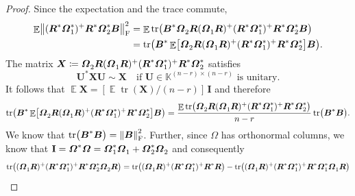 \documentclass[11pt]{article}
\newcommand{\field}{\mathbb{K}}
\DeclareMathOperator{\tr}{tr}
\newcommand{\mat}[1]{\boldsymbol{#1}}
\newcommand{\norm}[1]{\mleft\| #1 \mright\|}
\newcommand{\Id}{\mathbf{I}}
\DeclareMathOperator{\expect}{\mathbb{E}}
\theoremstyle{definition}
\numberwithin{equation}{section}
\begin{document}
\begin{proof}
Since the expectation and the trace commute,
\begin{align*}
    \expect \norm{(\mat{R}^* \mat{\varOmega}_1^*)^+ \mat{R}^* \mat{\varOmega}_2^* \mat{B}}_{\rm F}^2
    &= \expect \tr\bigl(\mat{B}^* \mat{\varOmega}_2^{\vphantom{*}} \mat{R} (\mat{\varOmega}_1^{\vphantom{*}} \mat{R})^{+} (\mat{R}^* \mat{\varOmega}_1^*)^{+} \mat{R}^* \mat{\varOmega}_2^* \mat{B}\bigr) \\
    &= \tr\bigl(\mat{B}^* \expect\bigl[ \mat{\varOmega}_2^{\vphantom{*}} \mat{R} (\mat{\varOmega}_1^{\vphantom{*}} \mat{R})^{+} (\mat{R}^* \mat{\varOmega}_1^*)^{+} \mat{R}^* \mat{\varOmega}_2^* \bigr] \mat{B}\bigr).
\end{align*}
The matrix $\mat{X} \coloneqq \mat{\varOmega}_2^{\vphantom{*}} \mat{R} (\mat{\varOmega}_1^{\vphantom{*}} \mat{R})^{+} (\mat{R}^* \mat{\varOmega}_1^*)^{+} \mat{R}^* \mat{\varOmega}_2^*$ satisfies
\begin{equation*}
\mat{U}^*\mat{X}\mat{U} \sim \mat{X} \quad \text{if } \mat{U} \in \field^{(n-r) \times (n-r)} \text{ is unitary}.
\end{equation*}
It follows that $\expect \mat{X} = [\expect \tr (\mat{X}) / (n-r) ] \,\Id$ and therefore
\begin{equation*}
    \tr\bigl(\mat{B}^* \expect\bigl[ \mat{\varOmega}_2^{\vphantom{*}} \mat{R} (\mat{\varOmega}_1^{\vphantom{*}} \mat{R})^{+} (\mat{R}^* \mat{\varOmega}_1^*)^{+} \mat{R}^* \mat{\varOmega}_2^* \bigr] \mat{B}\bigr)
    = \frac{ \expect \tr\bigl( \mat{\varOmega}_2^{\vphantom{*}} \mat{R} (\mat{\varOmega}_1^{\vphantom{*}} \mat{R})^{+} (\mat{R}^* \mat{\varOmega}_1^*)^{+} \mat{R}^* \mat{\varOmega}_2^* \bigr)}{n-r}
    \tr\bigl(\mat{B}^* \mat{B} \bigr).
\end{equation*}
We know that $\tr\bigl(\mat{B}^* \mat{B} \bigr) = \norm{\mat{B}}_{\rm F}^2$.
Further, since $\mat{\varOmega}$ has orthonormal columns, we know that $\Id = \mat{\varOmega}^* \mat{\varOmega} = \mat{\varOmega}_1^* \mat{\varOmega}_1^{\vphantom{*}} + \mat{\varOmega}_2^* \mat{\varOmega}_2^{\vphantom{*}}$ and consequently
\begin{align*}
    \tr\bigl( (\mat{\varOmega}_1^{\vphantom{*}} \mat{R})^{+} (\mat{R}^* \mat{\varOmega}_1^*)^{+} \mat{R}^* \mat{\varOmega}_2^* \mat{\varOmega}_2^{\vphantom{*}} \mat{R} \bigr) 
    &= \tr\bigl( (\mat{\varOmega}_1^{\vphantom{*}} \mat{R})^{+} (\mat{R}^* \mat{\varOmega}_1^*)^{+} \mat{R}^* \mat{R} \bigr)
    - \tr\bigl( (\mat{\varOmega}_1^{\vphantom{*}} \mat{R})^{+} (\mat{R}^* \mat{\varOmega}_1^*)^{+} \mat{R}^* \mat{\varOmega}_1^* \mat{\varOmega}_1^{\vphantom{*}} \mat{R} \bigr) \\

\end{align*}
\end{proof}
\end{document}
